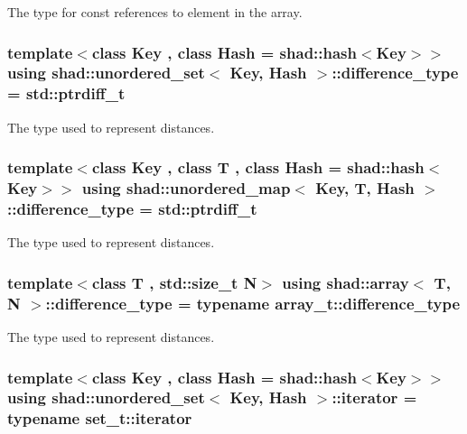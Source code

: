 The type for const references to element in the array. 

\hypertarget{group__Types_gaa58125290d23043a3bdfa2430291a1e8}{
\subsubsection[{difference\-\_\-type}]{\setlength{\rightskip}{0pt plus 5cm}template$<$class Key , class Hash  = shad\-::hash$<$\-Key$>$$>$ using {\bf shad\-::unordered\-\_\-set}$<$ Key, Hash $>$\-::difference\-\_\-type =  std\-::ptrdiff\-\_\-t}}\label{group__Types_gaa58125290d23043a3bdfa2430291a1e8}


The type used to represent distances. 

\hypertarget{group__Types_ga2a1294efcd043aa4bbb5da7c3c811448}{
\subsubsection[{difference\-\_\-type}]{\setlength{\rightskip}{0pt plus 5cm}template$<$class Key , class T , class Hash  = shad\-::hash$<$\-Key$>$$>$ using {\bf shad\-::unordered\-\_\-map}$<$ Key, T, Hash $>$\-::difference\-\_\-type =  std\-::ptrdiff\-\_\-t}}\label{group__Types_ga2a1294efcd043aa4bbb5da7c3c811448}


The type used to represent distances. 

\hypertarget{group__Types_ga588f85dc2eccfd3b3a1a6229d4cfd04a}{
\subsubsection[{difference\-\_\-type}]{\setlength{\rightskip}{0pt plus 5cm}template$<$class T , std\-::size\-\_\-t N$>$ using {\bf shad\-::array}$<$ T, N $>$\-::difference\-\_\-type =  typename array\-\_\-t\-::difference\-\_\-type}}\label{group__Types_ga588f85dc2eccfd3b3a1a6229d4cfd04a}


The type used to represent distances. 

\hypertarget{group__Types_gadbad50ac069a38bd820c0a9f532f903e}{
\subsubsection[{iterator}]{\setlength{\rightskip}{0pt plus 5cm}template$<$class Key , class Hash  = shad\-::hash$<$\-Key$>$$>$ using {\bf shad\-::unordered\-\_\-set}$<$ Key, Hash $>$\-::iterator =  typename set\-\_\-t\-::iterator}}\label{group__Types_gadbad50ac069a38bd820c0a9f532f903e}



